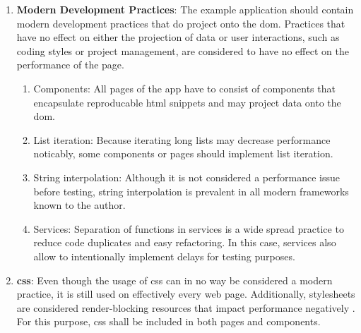 \documentclass[a4paper, 12pt]{article}
\begin{document}
\begin{enumerate}
  \item \textbf{Modern Development Practices}: The example application should contain modern development practices that do project onto the \acrshort{dom}.
  Practices that have no effect on either the projection of data or user interactions, such as coding styles or project management, are considered to have no effect on the performance of the page.
  
  \begin{enumerate}
    \item Components: All pages of the app have to consist of components that encapsulate reproducable \acrshort{html} snippets and may project data onto the \acrshort{dom}.
    \item List iteration: Because iterating long lists may decrease performance noticably, some components or pages should implement list iteration.
    \item String interpolation: Although it is not considered a performance issue before testing, string interpolation is prevalent in all modern frameworks known to the author.
    \item Services: \label{enum:services} Separation of functions in services is a wide spread practice to reduce code duplicates and easy refactoring.
    In this case, services also allow to intentionally implement delays for testing purposes.
  \end{enumerate}
  
  \item \textbf{\acrshort{css}}: Even though the usage of \acrshort{css} can in no way be considered a modern practice, it is still used on effectively every web page.
  Additionally, stylesheets are considered render-blocking resources that impact performance negatively \citep{renderblocking,eliminateRenderBlocking}.
  For this purpose, \acrshort{css} shall be included in both pages and components.
  

\end{enumerate}
\end{document}
